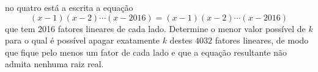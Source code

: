 no quatro está a escrita a equação \[ (x-1)(x-2)\cdots(x-2016) = (x-1)(x-2)\cdots (x-2016)\] que tem 2016 fatores lineares de cada lado. Determine o menor valor possível de $k$ para o qual é possível apagar exatamente $k$ destes $4032$ fatores lineares, de modo que fique pelo menos um fator de cada lado e que a equação resultante não admita nenhuma raiz real.
